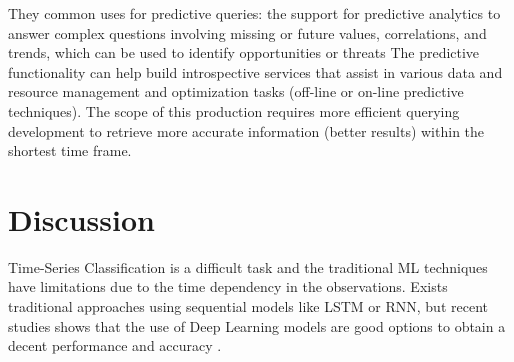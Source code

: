 They common uses for predictive queries: the support for predictive analytics to answer complex questions involving missing or future values, correlations, and trends, which  can be used to identify opportunities or threats
The predictive functionality can help build introspective services that assist in various data and resource management and optimization tasks (off-line or on-line predictive techniques). 
The  scope  of  this  production requires  more  efficient  querying development to  retrieve more accurate  information (better results)  within  the  shortest time  frame.

\section{Discussion}
Time-Series Classification is a difficult task and the traditional ML techniques have limitations due to the time dependency in the observations. Exists traditional approaches using sequential models like LSTM or RNN, but recent studies shows that the use of Deep Learning models are good options to obtain a decent performance and accuracy \cite{Fawaz2019}. 
